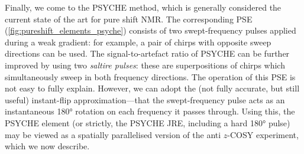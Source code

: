 Finally, we come to the PSYCHE method, which is generally considered the current state of the art for pure shift NMR.\autocite{Foroozandeh2014ACIE}
The corresponding PSE (\cref{fig:pureshift_elements_psyche}) consists of two swept-frequency pulses applied during a weak gradient: for example, a pair of chirps with opposite sweep directions can be used.
The signal-to-artefact ratio of PSYCHE can be further improved by using two \textit{saltire pulses}: these are superpositions of chirps which simultaneously sweep in both frequency directions\autocite{Foroozandeh2018CEJ}.
The operation of this PSE is not easy to fully explain\autocite{Foroozandeh2020JMR}. However, we can adopt the (not fully accurate, but still useful) instant-flip approximation\autocite{Zwahlen1997JACS,Kupce2007JMR}---that the swept-frequency pulse acts as an instantaneous \ang{180} rotation on each frequency it passes through.
Using this, the PSYCHE element (or strictly, the PSYCHE JRE, including a hard \ang{180} pulse) may be viewed as a spatially parallelised version of the anti $z$-COSY experiment\autocite{Oschkinat1986JMR,Pell2007MRC}, which we now describe.
